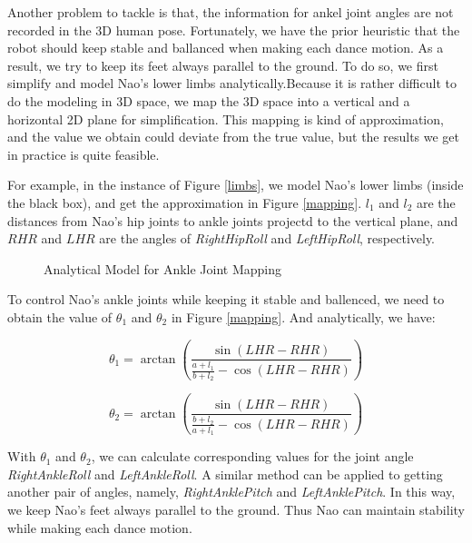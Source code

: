 \documentclass[UTF8,a4paper]{article}
\begin{document}
	Another problem to tackle is that, the information for ankel joint angles are not recorded in the 3D human pose. Fortunately, we have the prior heuristic that the robot should keep stable and ballanced when making each dance motion. As a result, we try to keep its feet always parallel to the ground. To do so, we first simplify and model Nao's lower limbs analytically.Because it is rather difficult to do the modeling in 3D space, we map the 3D space into a vertical and a horizontal 2D plane for simplification. This mapping is kind of approximation, and the value we obtain could deviate from the true value, but the results we get in practice is quite feasible. 

	For example, in the instance of Figure \ref{limbs}, we model Nao's lower limbs (inside the black box), and get the approximation in Figure \ref{mapping}. $l_1$ and $l_2$ are the distances from Nao's hip joints to ankle joints projectd to the vertical plane, and $RHR$ and $LHR$ are the angles of {\itshape RightHipRoll} and {\itshape LeftHipRoll}, respectively.
	
	\begin{figure}[!h] \centering    
		\caption{Analytical Model for Ankle Joint Mapping}     
		\label{ankle}     
	\end{figure} 

	To control Nao's ankle joints while keeping it stable and ballenced, we need to obtain the value of $\theta_1$ and $\theta_2$ in Figure \ref{mapping}. And analytically,  we have:

	\begin{equation}
		\theta_1 = \arctan\left(\frac{\sin(LHR - RHR)}{\frac{a+l_1}{b+l_2}-\cos(LHR-RHR)} \right)
	\end{equation}

	\begin{equation}
		\theta_2 = \arctan\left(\frac{\sin(LHR - RHR)}{\frac{b + l_2}{a + l_1}-\cos(LHR-RHR)} \right)
	\end{equation}

	With $\theta_1$ and $\theta_2$, we can calculate corresponding values for the joint angle {\itshape RightAnkleRoll} and {\itshape LeftAnkleRoll}. A similar method can be applied to getting another pair of angles, namely, {\itshape RightAnklePitch} and {\itshape LeftAnklePitch}. In this way, we keep Nao's feet always parallel to the ground. Thus Nao can maintain stability while making each dance motion.
\end{document}
